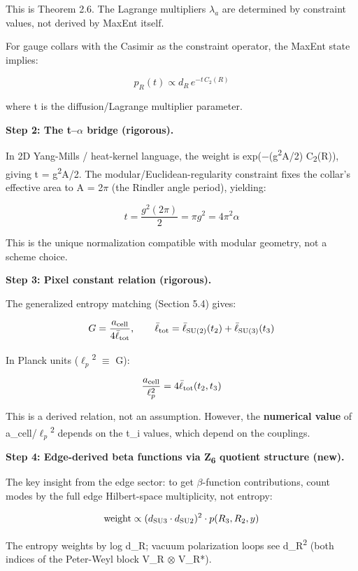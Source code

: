\documentclass[11pt,a4paper]{article}
\theoremstyle{remark}
\begin{document}
This is Theorem 2.6. The Lagrange multipliers \(\lambda_a\) are determined by constraint values, not derived by MaxEnt itself.

For gauge collars with the Casimir as the constraint operator, the MaxEnt state implies:

\[
p_R(t) \propto d_R \, e^{-t \, C_2(R)}
\]

where t is the diffusion/Lagrange multiplier parameter.

\textbf{Step 2: The t--\ensuremath{\alpha} bridge (rigorous).}

In 2D Yang-Mills / heat-kernel language, the weight is exp(\ensuremath{-}(g\textsuperscript{2}A/2) C\textsubscript{2}(R)), giving t = g\textsuperscript{2}A/2. The modular/Euclidean-regularity constraint fixes the collar's effective area to A = 2\ensuremath{\pi} (the Rindler angle period), yielding:

\[
t = \frac{g^2(2\pi)}{2} = \pi g^2 = 4\pi^2 \alpha
\]

This is the unique normalization compatible with modular geometry, not a scheme choice.

\textbf{Step 3: Pixel constant relation (rigorous).}

The generalized entropy matching (Section 5.4) gives:

\[
G = \frac{a_{\rm cell}}{4\bar{\ell}_{\rm tot}}, \qquad
\bar{\ell}_{\rm tot} = \bar{\ell}_{\rm SU(2)}(t_2) + \bar{\ell}_{\rm SU(3)}(t_3)
\]

In Planck units (\(\ell_p\)\textsuperscript{2} \ensuremath{\equiv} G):

\[
\frac{a_{\rm cell}}{\ell_p^2} = 4\bar{\ell}_{\rm tot}(t_2, t_3)
\]

This is a derived relation, not an assumption. However, the \textbf{numerical value} of a\_cell/\(\ell_p\)\textsuperscript{2} depends on the t\_i values, which depend on the couplings.

\textbf{Step 4: Edge-derived beta functions via Z\textsubscript{6} quotient structure (new).}

The key insight from the edge sector: to get \ensuremath{\beta}-function contributions, count modes by the full edge Hilbert-space multiplicity, not entropy:

\[
\text{weight} \propto (d_{\rm SU3} \cdot d_{\rm SU2})^2 \cdot p(R_3, R_2, y)
\]

The entropy weights by log d\_R; vacuum polarization loops see d\_R\textsuperscript{2} (both indices of the Peter-Weyl block V\_R \ensuremath{\otimes} V\_R*).
\end{document}
